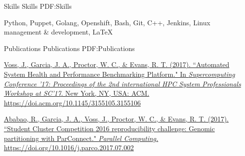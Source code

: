 \documentclass[letterpaper,MMMyyyy,nonstopmode]{simpleresumecv}
\begin{document}
\begin{Body}

\Section
{Skills}
{Skills}
{PDF:Skills}

\Entry
Python, 
Puppet,
Golang,
Openshift,
Bash,
Git, 
C++, 
Jenkins,
Linux management \& development, 
\LaTeX


\Section
{Publications}
{Publications}
{PDF:Publications}

\Entry
\href{http://doi.acm.org/10.1145/3155105.3155106}
{\underline{Voss, J.}, Garcia, J. A., Proctor, W. C., \& Evans, R. T.
(2017). ``Automated System Health and Performance Benchmarking Platform."
In \textit{Supercomputing Conference '17: Proceedings of the 2nd international
HPC System Professionals Workshop at SC'17}. New York, NY, USA: ACM.
https://doi.acm.org/10.1145/3155105.3155106}
\Gap

\Entry
\href{https://doi.org/10.1016/j.parco.2017.07.002}
{Ababao, R., Garcia, J. A., \underline{Voss, J.}, Proctor, W. C., \& Evans, R.
T. (2017). ``Student Cluster Competition 2016 reproducibility challenge: Genomic
partitioning with ParConnect." \textit{Parallel Computing.}
https://doi.org/10.1016/j.parco.2017.07.002}


% 
% 
% 

\end{Body}
\end{document}
